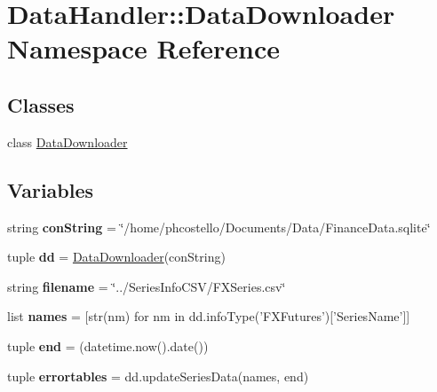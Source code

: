 \hypertarget{namespaceDataHandler_1_1DataDownloader}{\section{\-Data\-Handler\-:\-:\-Data\-Downloader \-Namespace \-Reference}
\label{namespaceDataHandler_1_1DataDownloader}
}
\subsection*{\-Classes}
\begin{DoxyCompactItemize}
\item 
class \hyperlink{classDataHandler_1_1DataDownloader_1_1DataDownloader}{\-Data\-Downloader}
\end{DoxyCompactItemize}
\subsection*{\-Variables}
\begin{DoxyCompactItemize}
\item 
\hypertarget{namespaceDataHandler_1_1DataDownloader_a4c4c103be23ab59888c852a69de49a0d}{string {\bfseries con\-String} = \char`\"{}/home/phcostello/\-Documents/\-Data/\-Finance\-Data.\-sqlite\char`\"{}}\label{namespaceDataHandler_1_1DataDownloader_a4c4c103be23ab59888c852a69de49a0d}

\item 
\hypertarget{namespaceDataHandler_1_1DataDownloader_a8745af1e7397bb2d39353979d6e5e9dc}{tuple {\bfseries dd} = \hyperlink{classDataHandler_1_1DataDownloader_1_1DataDownloader}{\-Data\-Downloader}(con\-String)}\label{namespaceDataHandler_1_1DataDownloader_a8745af1e7397bb2d39353979d6e5e9dc}

\item 
\hypertarget{namespaceDataHandler_1_1DataDownloader_a44552424fcd868c2dca24b193adb9949}{string {\bfseries filename} = \char`\"{}../\-Series\-Info\-C\-S\-V/\-F\-X\-Series.\-csv\char`\"{}}\label{namespaceDataHandler_1_1DataDownloader_a44552424fcd868c2dca24b193adb9949}

\item 
\hypertarget{namespaceDataHandler_1_1DataDownloader_a1774ada017217cbe878d9644b27ae51d}{list {\bfseries names} = \mbox{[}str(nm) for nm in dd.\-info\-Type('\-F\-X\-Futures')\mbox{[}'\-Series\-Name'\mbox{]}\mbox{]}}\label{namespaceDataHandler_1_1DataDownloader_a1774ada017217cbe878d9644b27ae51d}

\item 
\hypertarget{namespaceDataHandler_1_1DataDownloader_a4c7a6f6d15dd67f98b45c1ff7d636a54}{tuple {\bfseries end} = (datetime.\-now().date())}\label{namespaceDataHandler_1_1DataDownloader_a4c7a6f6d15dd67f98b45c1ff7d636a54}

\item 
\hypertarget{namespaceDataHandler_1_1DataDownloader_a72d05b1a140f872400033a6680716aec}{tuple {\bfseries errortables} = dd.\-update\-Series\-Data(names, end)}\label{namespaceDataHandler_1_1DataDownloader_a72d05b1a140f872400033a6680716aec}

\end{DoxyCompactItemize}


